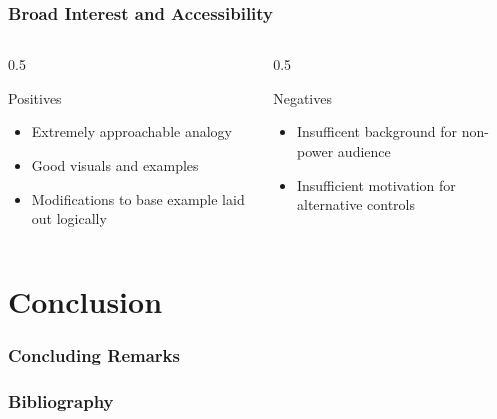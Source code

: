 \documentclass[
    aspectratio=169,
    \ifdefined\HANDOUT
    handout
    \else
    \fi
]{beamer}
\begin{document}
\begin{frame}
    \frametitle{Broad Interest and Accessibility}
    \begin{columns}
        \begin{column}{0.5\textwidth}
            \begin{block}{Positives}
                \begin{itemize}
                    \item Extremely approachable analogy
                    \item Good visuals and examples
                    \item Modifications to base example laid out logically
                \end{itemize}
            \end{block}
        \end{column}
        \begin{column}{0.5\textwidth}
            \begin{block}{Negatives}
                \begin{itemize}
                    \item Insufficent background for non-power audience
                    \item Insufficient motivation for alternative controls
                \end{itemize}
            \end{block}
        \end{column}
    \end{columns}
\end{frame}

\section{Conclusion}
\begin{frame}
    \frametitle{Concluding Remarks}
\end{frame}
\begin{frame}
    \frametitle{Bibliography}
    
    {
        \tiny
        
    }
\end{frame}
\end{document}
